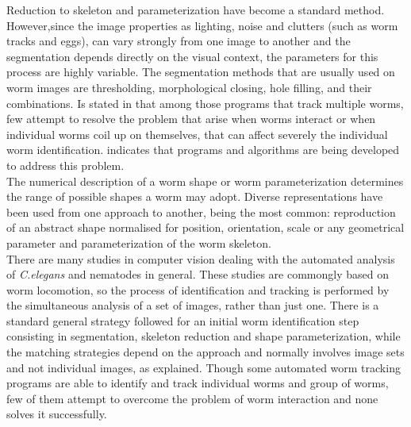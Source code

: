 Reduction to skeleton and parameterization have become a standard method. 
However,since the image properties as lighting, noise and clutters 
(such as worm tracks and eggs), can vary strongly from one image to another and 
the segmentation depends directly on the visual context, the  
parameters for this process are highly variable. The segmentation methods 
that are usually used 
on worm images are thresholding, morphological closing, 
hole filling, and their combinations.
Is stated in \cite{automated} that among those programs that track 
multiple worms, few attempt to resolve the problem that arise when 
worms interact or when individual worms coil up on themselves, that can
affect severely the individual worm identification. \cite{huang} indicates
that programs and algorithms are being developed to address this problem.\\

The  numerical description of a worm shape or worm parameterization 
determines the range of possible shapes a worm may adopt. Diverse 
representations have been used from one approach to another, being the 
most common: reproduction of an abstract shape normalised for position, 
orientation, scale or any geometrical parameter and parameterization of the 
worm skeleton.\\

There are many studies in computer vision dealing with the automated
analysis of \emph{C.elegans} and nematodes in general. These studies are
commongly based on worm locomotion, so the process of identification and 
tracking is performed by the simultaneous analysis of a set of images, rather
than just one. There is a standard general strategy followed for an initial
worm identification step consisting in segmentation, skeleton reduction and
shape parameterization, while the matching strategies depend on the approach
and normally involves image sets and not individual images, as explained.
Though some automated worm tracking programs are able to identify and track
individual worms and group of worms, few of them attempt to overcome the 
problem of worm interaction and none solves it successfully.
